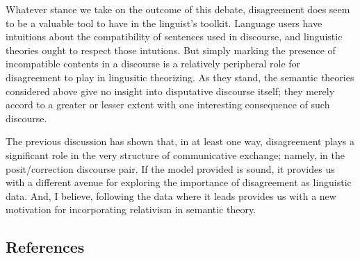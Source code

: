 \documentclass[letterpaper,]{article}
\begin{document}
Whatever stance we take on the outcome of this debate, disagreement does
seem to be a valuable tool to have in the linguist's toolkit. Language
users have intuitions about the compatibility of sentences used in
discourse, and linguistic theories ought to respect those intutions. But
simply marking the presence of incompatible contents in a discourse is a
relatively peripheral role for disagreement to play in lingusitic
theorizing. As they stand, the semantic theories considered above give
no insight into disputative discourse itself; they merely accord to a
greater or lesser extent with one interesting consequence of such
discourse.

The previous discussion has shown that, in at least one way,
disagreement plays a significant role in the very structure of
communicative exchange; namely, in the posit/correction discourse pair.
If the model provided is sound, it provides us with a different avenue
for exploring the importance of disagreement as linguistic data. And, I
believe, following the data where it leads provides us with a new
motivation for incorporating relativism in semantic theory.

\subsection{References}\label{references}

\printbibliography
\end{document}
